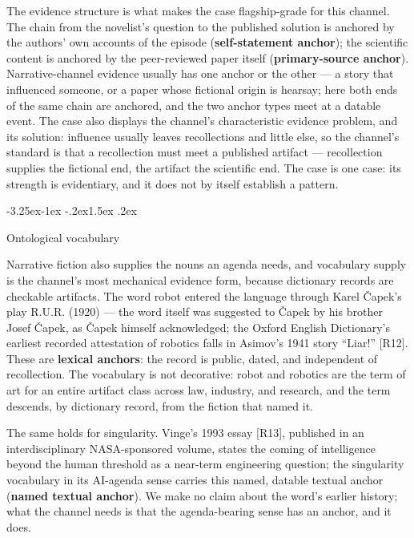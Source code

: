 \documentclass[11pt,a4paper]{article}
\makeatletter
\renewcommand\subsection{\@startsection{subsection}{2}{\z@}%
  {-3.25ex\@plus -1ex \@minus -.2ex}{1.5ex \@plus .2ex}%
  {\normalfont\large\bfseries\raggedright}}
\makeatother
\begin{document}
The evidence structure is what makes the case flagship-grade for this channel. The chain from the novelist's question to the published solution is anchored by the authors' own accounts of the episode (\textbf{self-statement anchor}); the scientific content is anchored by the peer-reviewed paper itself (\textbf{primary-source anchor}). Narrative-channel evidence usually has one anchor or the other — a story that influenced someone, or a paper whose fictional origin is hearsay; here both ends of the same chain are anchored, and the two anchor types meet at a datable event. The case also displays the channel's characteristic evidence problem, and its solution: influence usually leaves recollections and little else, so the channel's standard is that a recollection must meet a published artifact — recollection supplies the fictional end, the artifact the scientific end. The case is one case: its strength is evidentiary, and it does not by itself establish a pattern.

\subsection{Ontological vocabulary}

Narrative fiction also supplies the nouns an agenda needs, and vocabulary supply is the channel's most mechanical evidence form, because dictionary records are checkable artifacts. The word robot entered the language through Karel Čapek's play R.U.R. (1920) — the word itself was suggested to Čapek by his brother Josef Čapek, as Čapek himself acknowledged; the Oxford English Dictionary's earliest recorded attestation of robotics falls in Asimov's 1941 story ``Liar!'' [R12]. These are \textbf{lexical anchors}: the record is public, dated, and independent of recollection. The vocabulary is not decorative: robot and robotics are the term of art for an entire artifact class across law, industry, and research, and the term descends, by dictionary record, from the fiction that named it.

The same holds for singularity. Vinge's 1993 essay [R13], published in an interdisciplinary NASA-sponsored volume, states the coming of intelligence beyond the human threshold as a near-term engineering question; the singularity vocabulary in its AI-agenda sense carries this named, datable textual anchor (\textbf{named textual anchor}). We make no claim about the word's earlier history; what the channel needs is that the agenda-bearing sense has an anchor, and it does.
\end{document}
